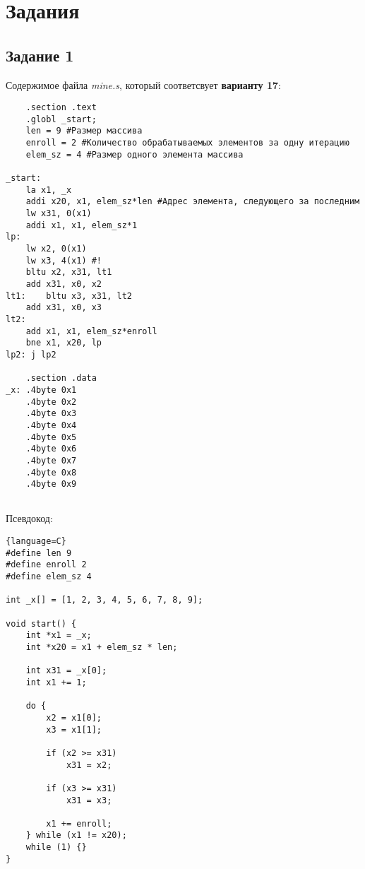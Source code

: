\chapter{Задания} 
\section{Задание 1}

Содержимое файла \textit{mine.s}, который соответсвует \textbf{варианту 17}:
\begin{lstlisting}
    .section .text
    .globl _start;
    len = 9 #Размер массива
    enroll = 2 #Количество обрабатываемых элементов за одну итерацию
    elem_sz = 4 #Размер одного элемента массива

_start:
    la x1, _x
    addi x20, x1, elem_sz*len #Адрес элемента, следующего за последним
    lw x31, 0(x1)
    addi x1, x1, elem_sz*1
lp:
    lw x2, 0(x1)
    lw x3, 4(x1) #!
    bltu x2, x31, lt1
    add x31, x0, x2
lt1:    bltu x3, x31, lt2
    add x31, x0, x3 
lt2:
    add x1, x1, elem_sz*enroll
    bne x1, x20, lp
lp2: j lp2

    .section .data
_x: .4byte 0x1
    .4byte 0x2
    .4byte 0x3
    .4byte 0x4
    .4byte 0x5
    .4byte 0x6
    .4byte 0x7
    .4byte 0x8
    .4byte 0x9
    
\end{lstlisting}

Псевдокод:
\begin{lstlisting}{language=C}
#define len 9
#define enroll 2
#define elem_sz 4

int _x[] = [1, 2, 3, 4, 5, 6, 7, 8, 9];

void start() {
    int *x1 = _x;
    int *x20 = x1 + elem_sz * len;

    int x31 = _x[0];
    int x1 += 1;

    do {
        x2 = x1[0];
        x3 = x1[1];

        if (x2 >= x31)
            x31 = x2;
        
        if (x3 >= x31)
            x31 = x3;
        
        x1 += enroll;
    } while (x1 != x20);
    while (1) {}
}
\end{lstlisting}

